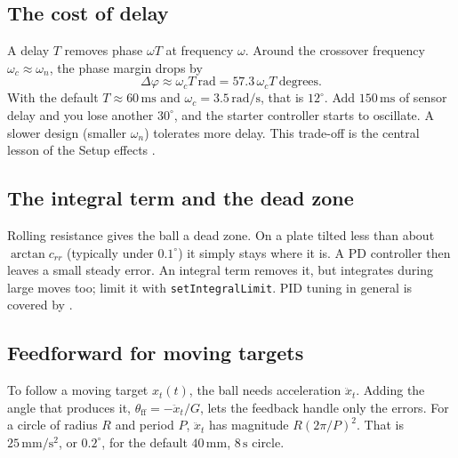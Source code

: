 \documentclass[10pt,a4paper]{article}
\newcommand{\un}[1]{\,\mathrm{#1}}
\begin{document}
\subsection{The cost of delay}
A delay $T$ removes phase $\omega T$ at frequency $\omega$. Around the crossover frequency
$\omega_c\approx\omega_n$, the phase margin drops by
\begin{equation}
  \Delta\varphi\approx\omega_cT\ \text{rad}=57.3\,\omega_cT\ \text{degrees}.
\end{equation}
With the default $T\approx60\un{ms}$ and $\omega_c=3.5\un{rad/s}$, that is $12^\circ$. Add
$150\un{ms}$ of sensor delay and you lose another $30^\circ$, and the starter controller starts
to oscillate. A slower design (smaller $\omega_n$) tolerates more delay. This trade-off is the
central lesson of the Setup effects \citep{astrom2008feedback,franklin2015feedback}.

\subsection{The integral term and the dead zone}
Rolling resistance gives the ball a dead zone. On a plate tilted less than about
$\arctan c_{rr}$ (typically under $0.1^\circ$) it simply stays where it is. A PD controller then
leaves a small steady error. An integral term removes it, but integrates during large moves
too; limit it with \texttt{setIntegralLimit}. PID tuning in general is covered by
\citet{astrom1995pid}.

\subsection{Feedforward for moving targets}
To follow a moving target $x_t(t)$, the ball needs acceleration $\ddot x_t$. Adding the angle
that produces it, $\theta_{\mathrm{ff}}=-\ddot x_t/G$, lets the feedback handle only the errors.
For a circle of radius $R$ and period $P$, $\ddot x_t$ has magnitude $R(2\pi/P)^2$. That is
$25\un{mm/s^2}$, or $0.2^\circ$, for the default $40\un{mm}$, $8\un{s}$ circle.

\end{document}
